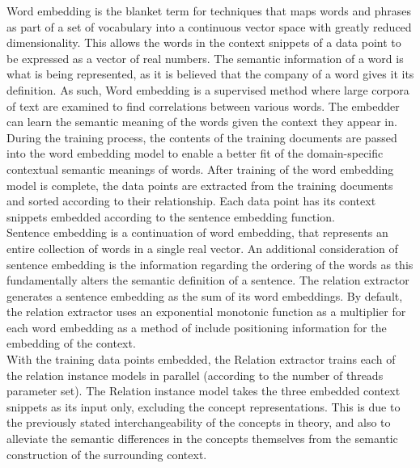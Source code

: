\documentclass[12pt]{article} %
\begin{document}
Word embedding is the blanket term for techniques that maps words and phrases as part of a set of vocabulary into a continuous vector space with greatly reduced dimensionality. This allows the words in the context snippets of a data point to be expressed as a vector of real numbers. The semantic information of a word is what is being represented, as it is believed that the company of a word gives it its definition. As such, Word embedding is a supervised method where large corpora of text are examined to find correlations between various words. The embedder can learn the semantic meaning of the words given the context they appear in.\\

During the training process, the contents of the training documents are passed into the word embedding model to enable a better fit of the domain-specific contextual semantic meanings of words. After training of the word embedding model is complete, the data points are extracted from the training documents and sorted according to their relationship. Each data point has its context snippets embedded according to the sentence embedding function.\\

Sentence embedding is a continuation of word embedding, that represents an entire collection of words in a single real vector. An additional consideration of sentence embedding is the information regarding the ordering of the words as this fundamentally alters the semantic definition of a sentence. The relation extractor generates a sentence embedding as the sum of its word embeddings. By default, the relation extractor uses an exponential monotonic function as a multiplier for each word embedding as a method of include positioning information for the embedding of the context.\\

With the training data points embedded, the Relation extractor trains each of the relation instance models in parallel (according to the number of threads parameter set). The Relation instance model takes the three embedded context snippets as its input only, excluding the concept representations. This is due to the previously stated interchangeability of the concepts in theory, and also to alleviate the semantic differences in the concepts themselves from the semantic construction of the surrounding context.\\
\end{document}
